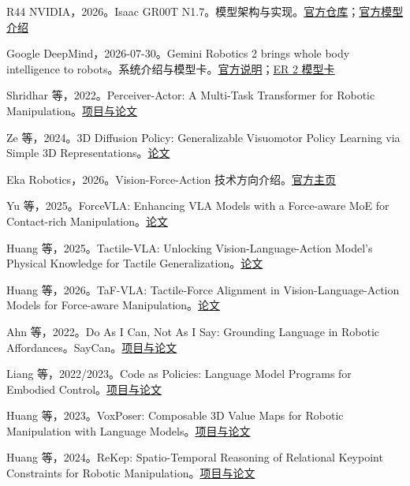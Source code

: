 \documentclass[UTF8,a4paper,11pt,oneside,openany,fontset=none]{ctexbook}
\begin{document}
\begin{thebibliography}{R44}
 NVIDIA，2026。Isaac GR00T N1.7。模型架构与实现。\href{https://github.com/NVIDIA/Isaac-GR00T}{官方仓库}；\href{https://huggingface.co/blog/nvidia/gr00t-n1-7}{官方模型介绍}

 Google DeepMind，2026-07-30。Gemini Robotics 2 brings whole body intelligence to robots。系统介绍与模型卡。\href{https://deepmind.google/blog/gemini-robotics-2-brings-whole-body-intelligence-to-robots/}{官方说明}；\href{https://deepmind.google/models/model-cards/gemini-robotics-er-2/}{ER 2 模型卡}

 Shridhar 等，2022。Perceiver-Actor: A Multi-Task Transformer for Robotic Manipulation。\href{https://peract.github.io/}{项目与论文}

 Ze 等，2024。3D Diffusion Policy: Generalizable Visuomotor Policy Learning via Simple 3D Representations。\href{https://arxiv.org/abs/2403.03954}{论文}

 Eka Robotics，2026。Vision-Force-Action 技术方向介绍。\href{https://ekarobotics.com/}{官方主页}

 Yu 等，2025。ForceVLA: Enhancing VLA Models with a Force-aware MoE for Contact-rich Manipulation。\href{https://arxiv.org/abs/2505.22159}{论文}

 Huang 等，2025。Tactile-VLA: Unlocking Vision-Language-Action Model's Physical Knowledge for Tactile Generalization。\href{https://arxiv.org/abs/2507.09160}{论文}

 Huang 等，2026。TaF-VLA: Tactile-Force Alignment in Vision-Language-Action Models for Force-aware Manipulation。\href{https://arxiv.org/abs/2601.20321}{论文}

 Ahn 等，2022。Do As I Can, Not As I Say: Grounding Language in Robotic Affordances。SayCan。\href{https://say-can.github.io/}{项目与论文}

 Liang 等，2022/2023。Code as Policies: Language Model Programs for Embodied Control。\href{https://code-as-policies.github.io/}{项目与论文}

 Huang 等，2023。VoxPoser: Composable 3D Value Maps for Robotic Manipulation with Language Models。\href{https://voxposer.github.io/}{项目与论文}

 Huang 等，2024。ReKep: Spatio-Temporal Reasoning of Relational Keypoint Constraints for Robotic Manipulation。\href{https://rekep-robot.github.io/}{项目与论文}


\end{thebibliography}
\end{document}
